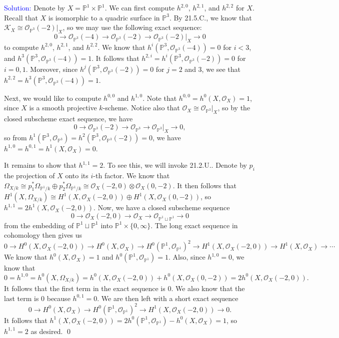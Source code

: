 \documentclass[11pt]{article}
\newcommand{\PP}{\mathbb{P}}
\newcommand{\cK}{\mathcal{K}}
\newcommand{\cO}{\mathcal{O}}
\newenvironment{solution}{\begin{trivlist}\item[]{\textcolor{blue}{Solution:}}}{\qed \end{trivlist}}
\begin{document}
\begin{solution}
    Denote by $X = \PP^1 \times \PP^1$. 
    We can first compute $h^{2,0}$, $h^{2,1}$, and $h^{2,2}$ for $X$. Recall that $X$ is isomorphic to a quadric surface in $\PP^3$. By 21.5.C., we know that $\cK_{X} \cong \cO_{\PP^3}(-2)|_X$, so we may use the following exact sequence:
    \[
        0 \longrightarrow \cO_{\PP^3}(-4) \longrightarrow \cO_{\PP^3}(-2) 
        \longrightarrow \cO_{\PP^3}(-2)|_{X} \longrightarrow 0
    \]
    to compute $h^{2,0}$, $h^{2,1}$, and $h^{2,2}$. We know that $h^i(\PP^3, \cO_{\PP^3}(-4)) = 0$ for $i < 3$, and $h^3(\PP^3, \cO_{\PP^3}(-4)) = 1$. It follows that $h^{2,i} = h^{i}(\PP^3, \cO_{\PP^3}(-2)) = 0$ for $i = 0, 1$. Moreover, since $h^j(\PP^3, \cO_{\PP^3}(-2)) = 0$ for $j = 2$ and $3$, we see that $h^{2,2} = h^3(\PP^3, \cO_{\PP^3}(-4)) = 1$. 

    Next, we would like to compute $h^{0,0}$ and $h^{1,0}$. Note that $h^{0,0} = h^0(X, \cO_X) = 1$, since $X$ is a smooth projective $k$-scheme. Notice also that $\cO_X \cong \cO_{\PP^3}|_X$, so by the closed subscheme exact sequence, we have 
    \[
        0 \longrightarrow \cO_{\PP^3}(-2) \longrightarrow \cO_{\PP^3} \longrightarrow \cO_{\PP^3}|_X \longrightarrow 0,
    \]
    so from $h^1(\PP^3, \cO_{\PP^3}) = h^2(\PP^3, \cO_{\PP^3}(-2)) = 0$, we have $h^{1,0} = h^{0,1} = h^1(X, \cO_X) = 0$. 

    It remains to show that $h^{1,1} = 2$. To see this, we will invoke 21.2.U.. Denote by $p_i$ the projection of $X$ onto its $i$-th factor. We know that $\Omega_{X/k} \cong p_1^* \Omega_{\PP^1/k} \oplus p_2^* \Omega_{\PP^1/k} \cong \cO_X(-2,0) \otimes \cO_X(0,-2)$. It then follows that $H^1(X, \Omega_{X/k}) \cong H^1(X, \cO_X(-2,0)) \oplus H^1(X, \cO_X(0,-2))$, so $h^{1,1} = 2 h^1(X, \cO_X(-2,0))$. Now, we have a closed subscheme sequence
    \[
        0 \longrightarrow \cO_{X}(-2, 0) \longrightarrow \cO_X \longrightarrow \cO_{\PP^1 \sqcup \PP^1} \longrightarrow 0
    \]
    from the embedding of $\PP^1 \sqcup \PP^1$ into $\PP^1 \times \{0, \infty\}$. The long exact sequence in cohomology then gives us 
    \[
        0 \rightarrow H^0(X, \cO_{X}(-2, 0)) \rightarrow H^0(X, \cO_X) \rightarrow H^0(\PP^1, \cO_{\PP^1})^2 \rightarrow H^1(X, \cO_X(-2,0)) \rightarrow H^1(X, \cO_X) \rightarrow \cdots
    \]
    We know that $h^0(X, \cO_X) = 1$ and $h^0(\PP^1, \cO_{\PP^1}) = 1$. Also, since $h^{1,0} = 0$, we know that 
    \[
        0 = h^{1,0} = h^0(X, \Omega_{X/k})
        = h^0(X, \cO_X(-2,0)) + h^0(X, \cO_{X}(0, -2))
        = 2h^0(X, \cO_X(-2,0)).
    \]
    It follows that the first term in the exact sequence is 0. We also know that the last term is $0$ because $h^{0, 1} = 0$. We are then left with a short exact sequence 
    \[
        0 \longrightarrow H^0(X, \cO_X) \longrightarrow H^0(\PP^1, \cO_{\PP^1})^2 \longrightarrow H^1(X, \cO_X(-2,0)) \longrightarrow 0.
    \]
    It follows that $h^1(X, \cO_X(-2,0)) = 2h^0(\PP^1, \cO_{\PP^1}) - h^0(X, \cO_X) = 1$, so $h^{1,1} = 2$ as desired. 
\end{solution}
\end{document}
